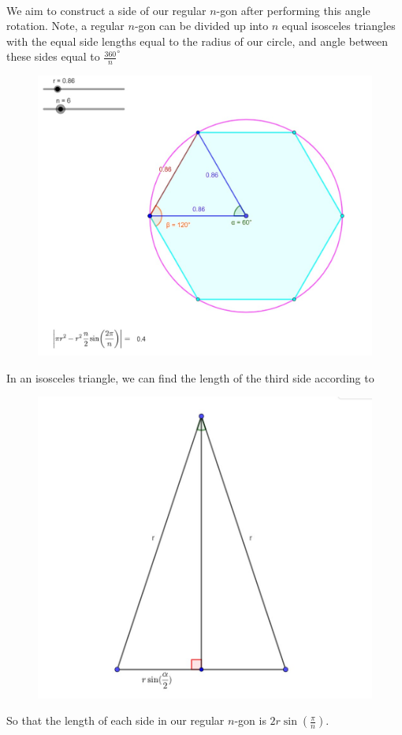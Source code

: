 \documentclass[11pt]{amsart}
\theoremstyle{plain}
\theoremstyle{definition}
\theoremstyle{remark}
\begin{document}
\\[1\baselineskip]
We aim to construct a side of our regular \(n\)-gon after performing this angle rotation.  Note, a regular \(n\)-gon can be divided up into \(n\) equal isosceles triangles with the equal side lengths equal to the radius of our circle, and angle between these sides equal to \(\frac{360}{n}^{\circ}\) 
\begin{center}
	\begin{figure}[h]
		\includegraphics[scale=0.25]{circle_8.jpg}
	\end{figure}
\end{center}
In an isosceles triangle, we can find the length of the third side according to
\begin{center}
	\begin{figure}[h]
		\includegraphics[scale=0.5]{isos.jpg}
	\end{figure}
\end{center}
So that the length of each side in our regular \(n\)-gon is \(2r\sin\left( \frac{\pi}{n} \right)\).
\end{document}
